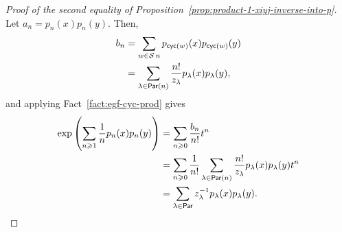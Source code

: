 \begin{proof}[Proof of the second equality of Proposition~\ref{prop:product-1-xiyj-inverse-into-p}]
	Let \(a_n = p_n(x)p_n(y)\).
	Then,
	\begin{align}
		b_n
		&= \sum_{w \in \operatorname{\mathcal{S}}{n}} p_{\operatorname{\mathsf{cyc}}(w)}(x) p_{\operatorname{\mathsf{cyc}}(w)}(y) \\
		&= \sum_{\lambda \in \operatorname{\mathsf{Par}}(n)} \frac{n!}{z_\lambda} p_\lambda(x) p_\lambda(y),
	\end{align}
	and applying Fact~\ref{fact:egf-cyc-prod} gives
	\begin{align}
		\exp\left(
			\sum_{n \geqslant 1} \frac{1}{n} p_n(x) p_n(y)
		\right)
		&= \sum_{n \geqslant 0} \frac{b_n}{n!} t^n \\
		&= \sum_{n \geqslant 0} \frac{1}{n!} \sum_{\lambda \in \operatorname{\mathsf{Par}}(n)} \frac{n!}{z_\lambda} p_\lambda(x) p_\lambda(y) t^n \\
		&= \sum_{\lambda \in \operatorname{\mathsf{Par}}} z_\lambda^{-1} p_\lambda(x) p_\lambda(y). \qedhere
	\end{align}
\end{proof}